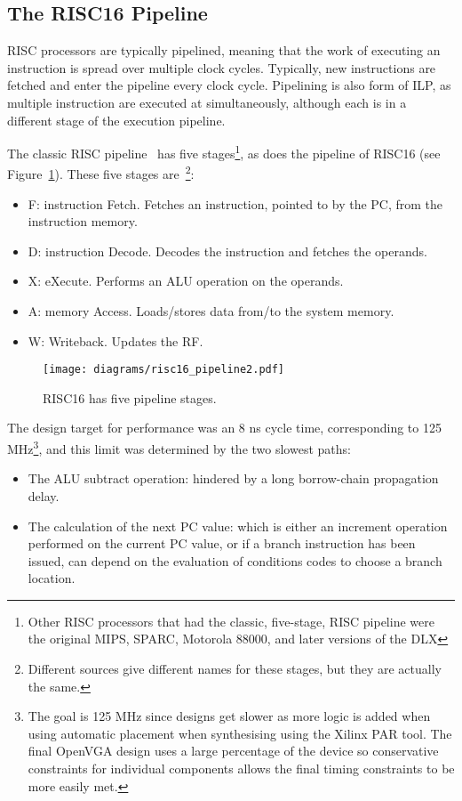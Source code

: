 \subsection{The RISC16 Pipeline}
RISC processors are typically pipelined, meaning that the work of executing an
instruction is spread over multiple clock cycles. Typically, new instructions are
fetched and enter the pipeline every clock cycle. Pipelining is also form of ILP,
as multiple instruction are executed at simultaneously, although each is in a
different stage of the execution pipeline.

The classic RISC pipeline~\cite{smith1994paa} has five stages\footnote{Other RISC
processors that had the classic, five-stage, RISC pipeline were the original
MIPS, SPARC, Motorola 88000, and later versions of the DLX\cite{smith1994paa}},
as does the pipeline of RISC16 (see Figure~\ref{RISC16_Pipeline}). These five
stages are~\cite{Comp_Arch}\footnote{Different sources give different names for
these stages, but they are actually the same.}:
\begin{itemize}
  \item F: instruction Fetch. Fetches an instruction, pointed to by the PC, from
  the instruction memory.
  \item D: instruction Decode. Decodes the instruction and fetches the operands.
  \item X: eXecute. Performs an ALU operation on the operands.
  \item A: memory Access. Loads/stores data from/to the system memory.
  \item W: Writeback. Updates the RF.
\end{itemize}

\begin{figure}[h!]
\begin{center}
\texttt{[image: diagrams/risc16\_pipeline2.pdf]}
\caption[RISC16 pipeline]{RISC16 has five pipeline stages.}
\label{RISC16_Pipeline}
\end{center}
\end{figure}

The design target for performance was an 8 ns cycle time, corresponding to 125
MHz\footnote{The goal is 125 MHz since designs get slower as more logic is
added when using automatic placement when synthesising using the Xilinx PAR
tool. The final OpenVGA design uses a large percentage of the device so
conservative constraints for individual components allows the final timing
constraints to be more easily met.}, and this limit was determined by the two
slowest paths:
\begin{itemize}
  \item The ALU subtract operation: hindered by a long borrow-chain propagation
  delay.
  \item The calculation of the next PC value: which is either an
  increment operation performed on the current PC value, or if a branch
  instruction has been issued, can depend on the evaluation of conditions codes
  to choose a branch location.
\end{itemize}

